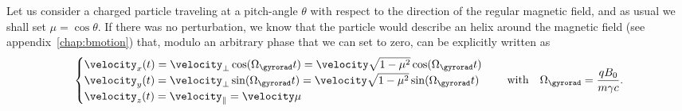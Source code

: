 Let us consider a charged particle traveling at a pitch-angle $\theta$ with respect
to the direction of the regular magnetic field, and as usual we shall set
$\mu = \cos\theta$. If there was no perturbation, we know that the particle
would describe an helix around the magnetic field (see appendix~\ref{chap:bmotion})
that, modulo an arbitrary phase that we can set to zero, can be explicitly written as
\begin{align*}
  \begin{cases}
  \velocity_x(t) = \velocity_\perp \cos(\Omega_\gyrorad t) =
  \velocity \sqrt{1 - \mu^2} \cos(\Omega_\gyrorad t)\\
  \velocity_y(t) = \velocity_\perp \sin(\Omega_\gyrorad t) =
  \velocity \sqrt{1 - \mu^2} \sin(\Omega_\gyrorad t) \\
  \velocity_z(t) = \velocity_\parallel  = \velocity\mu
  \end{cases}
  \quad\text{with}\quad
  \Omega_\gyrorad = \frac{qB_0}{m \gamma c}.
\end{align*}

